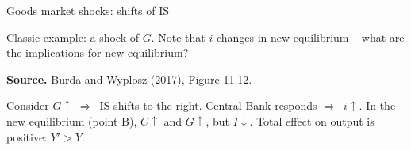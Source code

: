 \documentclass{beamer}
\newcommand{\tb}[1]{{\color{blue}{\textbf{#1}}}}
\newcommand{\rarr}{$\Rightarrow$\ }
\begin{document}
\begin{frame}{Goods market shocks: shifts of IS}

Classic example: a shock of $G$. Note that $i$ changes in new equilibrium -- what are the implications for new equilibrium?

\begin{center}

\begin{figure}[h!]
	
\end{figure}

\begin{minipage}{0.6\columnwidth}
\tiny	
\textbf{Source.} Burda and Wyplosz (2017), Figure 11.12.\\
\end{minipage}
\end{center}
\vfill
Consider $G\uparrow$ \rarr IS shifts to the right. Central Bank responds \rarr $i \uparrow$. In the new equilibrium (point B), $C\uparrow$ and $G\uparrow$, but $I\downarrow$. Total effect on output is positive: $Y' > Y$.   
\end{frame}
\end{document}
